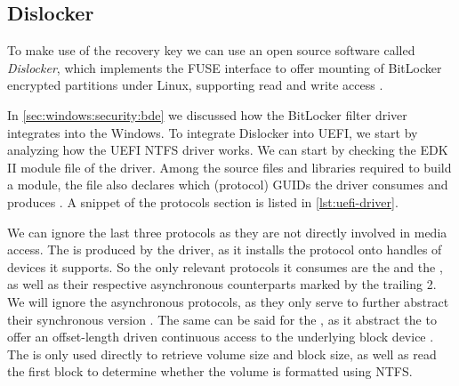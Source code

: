 \subsection{Dislocker}

To make use of the recovery key we can use an open source software called \emph{Dislocker}, which implements the \ac{FUSE} interface to offer mounting of BitLocker encrypted partitions under Linux, supporting read and write access \cite{dislocker}.

In \autoref{sec:windows:security:bde} we discussed how the BitLocker filter driver integrates into the Windows.
To integrate Dislocker into \ac{UEFI}, we start by analyzing how the \ac{UEFI} \ac{NTFS} driver works.
We can start by checking the \ac{EDK} II module file of the driver.
Among the source files and libraries required to build a module, the file also declares which (protocol) \acp{GUID} the driver consumes and produces \cite{tianocore-edk2-module-writer-s-guide}.
A snippet of the protocols section is listed in \autoref{lst:uefi-driver}.

\vspace{1em}



We can ignore the last three protocols as they are not directly involved in media access.
The  is produced by the driver, as it installs the protocol onto handles of devices it supports.
So the only relevant protocols it consumes are the  and the , as well as their respective asynchronous counterparts marked by the trailing 2.
We will ignore the asynchronous protocols, as they only serve to further abstract their synchronous version \cite[Sections 13.8 and 13.10]{uefi-spec}.
The same can be said for the , as it abstract the  to offer an offset-length driven continuous access to the underlying block device \cite[Section 13.7]{uefi-spec}.
The  is only used directly to retrieve volume size and block size, as well as read the first block to determine whether the volume is formatted using \ac{NTFS}.

